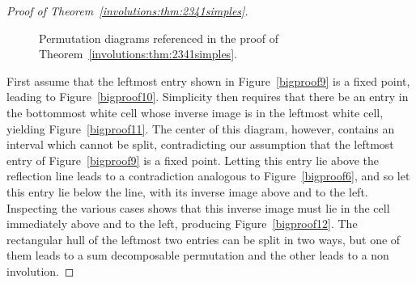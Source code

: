 \documentclass[12pt,twoside]{memoir}
\begin{document}
\begin{proof}[Proof of Theorem~\ref{involutions:thm:2341simples}]
\begin{figure}
{
            }

            \caption{Permutation diagrams referenced in the proof of
            Theorem~\ref{involutions:thm:2341simples}.}
            \label{figure:6_1-group-3} 
          \end{figure}
           
           

          First assume that the leftmost entry shown in Figure~\ref{bigproof9} is a
          fixed point, leading to Figure~\ref{bigproof10}. Simplicity then
          requires that there be an entry in the bottommost white cell whose
          inverse image is in the leftmost white cell, yielding
          Figure~\ref{bigproof11}. The center of this diagram, however, contains
          an interval which cannot be split, contradicting our assumption that
          the leftmost entry of Figure~\ref{bigproof9} is a fixed point.
          Letting this entry lie above the reflection line leads to a
          contradiction analogous to Figure~\ref{bigproof6}, and so let this
          entry lie below the line, with its inverse image above and to the left.
          Inspecting the various cases shows that this inverse image must lie in
          the cell immediately above and to the left, producing
          Figure~\ref{bigproof12}. The rectangular hull of the leftmost two
          entries can be split in two ways, but one of them leads to a sum
          decomposable permutation and the other leads to a non involution. 


\end{proof}
\end{document}
